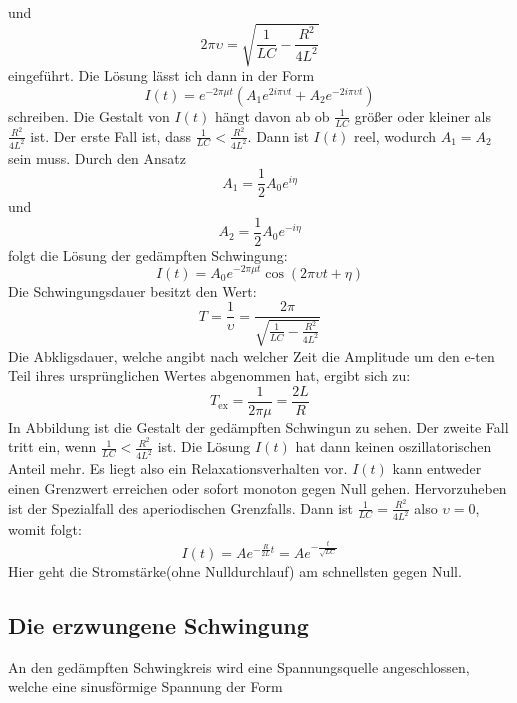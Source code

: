 und
\begin{equation*}
  2 \pi \upsilon = \sqrt{\frac{1}{LC}-\frac{R^2}{4L^2}}
\end{equation*}
eingeführt.
Die Lösung lässt ich dann in der Form
\begin{equation}
\label{eq:steig}
  I(t)= e^{-  2\pi \mu t} (A_1 e^{2 i \pi \upsilon t} + A_2 e^{-2 i \pi \upsilon t})
\end{equation}
schreiben.
Die Gestalt von $I(t)$ hängt davon ab ob $\frac{1}{LC}$ größer oder kleiner als $\frac{R^2}{4L^2}$ ist.
Der erste Fall ist, dass $\frac{1}{LC}<\frac{R^2}{4L^2}$.
Dann ist $I(t)$ reel, wodurch $A_1=A_2$ sein muss.
Durch den Ansatz
\begin{equation}
  A_1 = \frac{1}{2}A_0 e^{i \eta}
\end{equation}
und
\begin{equation}
A_2 = \frac{1}{2}A_0 e^{-i \eta}
\end{equation}
folgt die Lösung der gedämpften Schwingung:
\begin{equation}
  I(t) = A_0 e^{- 2 \pi \mu t} \cos(2 \pi \upsilon t + \eta)
\end{equation}
Die Schwingungsdauer besitzt den Wert:
\begin{equation}
  T = \frac{1}{\upsilon}=\frac{2 \pi}{\sqrt{\frac{1}{LC}-\frac{R^2}{4L^2}}}
\end{equation}
Die Abkligsdauer, welche angibt nach welcher Zeit die Amplitude um den e-ten Teil ihres ursprünglichen Wertes abgenommen hat, ergibt sich zu:
\begin{equation}
  T_\text{ex}=\frac{1}{2 \pi \mu}=\frac{2L}{R}
\end{equation}
In Abbildung ist die Gestalt der gedämpften Schwingun zu sehen.
Der zweite Fall tritt ein, wenn $\frac{1}{LC}<\frac{R^2}{4L^2}$ ist.
Die Lösung $I(t)$ hat dann keinen oszillatorischen Anteil mehr.
Es liegt also ein Relaxationsverhalten vor.
$I(t)$ kann entweder einen Grenzwert erreichen oder sofort monoton gegen Null gehen.
Hervorzuheben ist der Spezialfall des aperiodischen Grenzfalls.
Dann ist $\frac{1}{LC}=\frac{R^2}{4L^2}$ also $\upsilon=0$, womit folgt:
\begin{equation}
  I(t)=Ae^{-\frac{R}{2L}t}=Ae^{-\frac{t}{\sqrt{LC}}}
\end{equation}
Hier geht die Stromstärke(ohne Nulldurchlauf) am schnellsten gegen Null.
\subsection{Die erzwungene Schwingung}
An den gedämpften Schwingkreis wird eine Spannungsquelle angeschlossen, welche eine sinusförmige Spannung der Form

